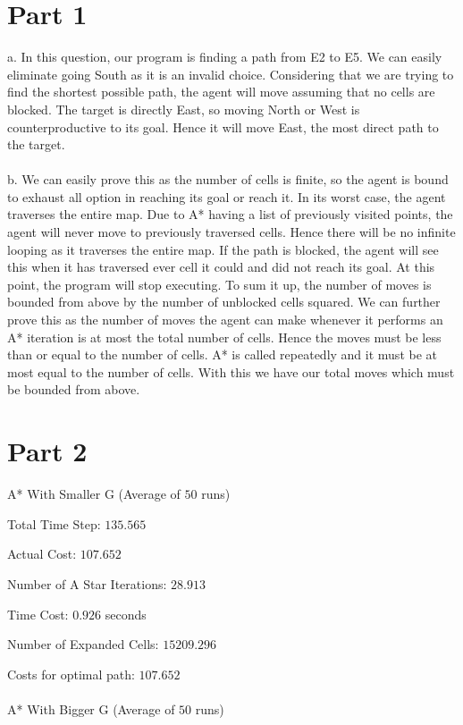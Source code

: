 \documentclass{article}
\begin{document}
\section*{Part 1}

a. In this question, our program is finding a path from E2 to E5. We can easily eliminate going South as it is an invalid choice. Considering that we are trying to find the shortest possible path, the agent will move assuming that no cells are blocked. The target is directly East, so moving North or West is counterproductive to its goal. Hence it will move East, the most direct path to the target.\\
\\
b. We can easily prove this as the number of cells is finite, so the agent is bound to exhaust all option in reaching its goal or reach it. In its worst case, the agent traverses the entire map. Due to A* having a list of previously visited points, the agent will never move to previously traversed cells. Hence there will be no infinite looping as it traverses the entire map. If the path is blocked, the agent will see this when it has traversed ever cell it could and did not reach its goal. At this point, the program will stop executing. To sum it up, the number of moves is bounded from above by the number of unblocked cells squared. We can further prove this as the number of moves the agent can make whenever it performs an A* iteration is at most the total number of cells. Hence the moves must be less than or equal to the number of cells. A* is called repeatedly and it must be at most equal to the number of cells. With this we have our total moves which must be bounded from above.




\section*{Part 2}

A* With Smaller G (Average of $50$ runs)

Total Time Step: $135.565$

Actual Cost: $107.652$

Number of A Star Iterations: $28.913$

Time Cost: $0.926$ seconds

Number of Expanded Cells: $15209.296$

Costs for optimal path: $107.652$
\\ 
\\A* With Bigger G (Average of $50$ runs)
\end{document}
